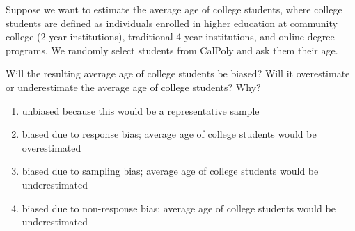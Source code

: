 
\begin{frame}
\small{Suppose we want to estimate the average age of college students, where college students are defined as individuals enrolled in higher education at community college (2 year institutions), traditional 4 year institutions, and online degree programs.  We randomly select students from CalPoly and ask them their age.}
\begin{clicker}{Will the resulting average age of college students be biased?  Will it overestimate or underestimate the average age of college students? Why?}
\begin{enumerate}
    \item
    unbiased because this would be a representative sample
    \item
    biased due to response bias; average age of college students would be overestimated
    \item
    biased due to sampling bias; average age of college students would be underestimated
    \item
    biased due to non-response bias; average age of college students would be underestimated
\end{enumerate}
\end{clicker}
\end{frame}

